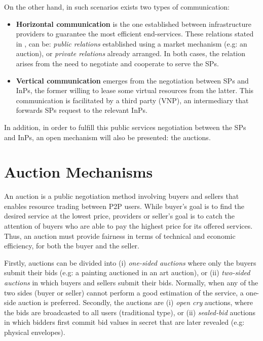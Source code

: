 On the other hand, in such scenarios exists two types of communication:
\begin{itemize}
	
	\item \textbf{Horizontal communication} is the one established between infrastructure providers to guarantee the most efficient end-services. These relations stated in \citep{zaheer2010multi}, can be: \textit{public relations} established using a market mechanism (e.g: an auction), or \textit{private relations} already arranged. In both cases, the relation arises from the need to negotiate and cooperate to serve the SPs.
	\item \textbf{Vertical communication} emerges from the negotiation between SPs and InPs, the former willing to lease some virtual resources from the latter. This communication is facilitated by a third party (VNP), an intermediary that forwards SPs request to the relevant InPs.
\end{itemize}

In addition, in order to fulfill this public services negotiation between the SPs and InPs, an open mechanism will also be presented: the auctions.

\section{Auction Mechanisms}

An auction is a public negotiation method involving buyers and sellers that enables resource trading between P2P users. While buyer's goal is to find the desired service at the lowest price, providers or seller's goal is to catch the attention of buyers who are able to pay the highest price for its offered services. Thus, an auction must provide fairness in terms of technical and economic efficiency, for both the buyer and the seller.

Firstly, auctions can be divided into (i) \textit{one-sided auctions} where only the buyers submit their bids (e.g: a painting auctioned in an art auction), or (ii) \textit{two-sided auctions} in which buyers and sellers submit their bids. Normally, when any of the two sides (buyer or seller) cannot perform a good estimation of the service, a one-side auction is preferred. Secondly, the auctions are (i) \textit{open cry} auctions, where the bids are broadcasted to all users (traditional type), or (ii) \textit{sealed-bid} auctions in which bidders first commit bid values in secret that are later revealed (e.g: physical envelopes).

